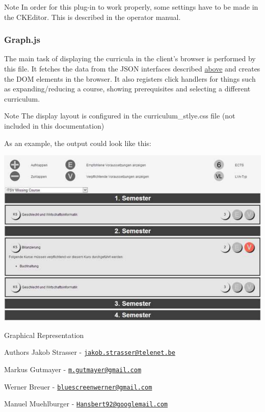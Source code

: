 \begin{DoxyNote}{Note}
In order for this plug-\/in to work properly, some settings have to be made in the C\+K\+Editor. This is described in the operator manual.
\end{DoxyNote}
\hypertarget{group___drupal2_a_g_g_agggraph}{}\subsubsection{Graph.\+js}\label{group___drupal2_a_g_g_agggraph}
The main task of displaying the curricula in the client's browser is performed by this file. It fetches the data from the J\+S\+O\+N interfaces described \hyperlink{index_json}{above} and creates the D\+O\+M elements in the browser. It also registers click handlers for things such as expanding/reducing a course, showing prerequisites and selecting a different curriculum. \begin{DoxyNote}{Note}
The display layout is configured in the curriculum\+\_\+stlye.\+css file (not included in this documentation)
\end{DoxyNote}
As an example, the output could look like this\+:


\begin{DoxyImage}
\includegraphics[width=\textwidth]{Drupal2AGG}
\caption{Graphical Representation}
\end{DoxyImage}


\begin{DoxyAuthor}{Authors}
Jakob Strasser -\/ \href{mailto:jakob.strasser@telenet.be}{\tt jakob.\+strasser@telenet.\+be} 

Markus Gutmayer -\/ \href{mailto:m.gutmayer@gmail.com}{\tt m.\+gutmayer@gmail.\+com} 

Werner Breuer -\/ \href{mailto:bluescreenwerner@gmail.com}{\tt bluescreenwerner@gmail.\+com} 

Manuel Muehlburger -\/ \href{mailto:Hansbert92@googlemail.com}{\tt Hansbert92@googlemail.\+com} 
\end{DoxyAuthor}


